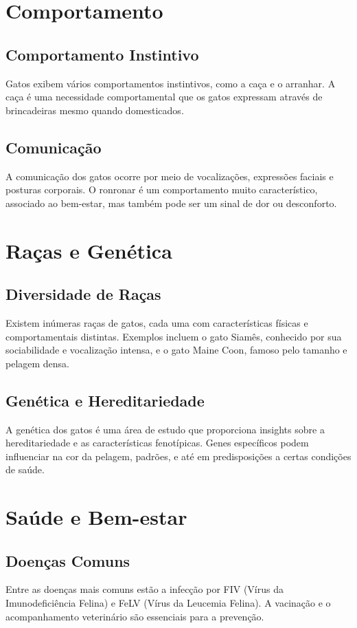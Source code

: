 \documentclass[a4paper,12pt]{report}
\begin{document}
\chapter{Comportamento}
\section{Comportamento Instintivo}
Gatos exibem vários comportamentos instintivos, como a caça e o arranhar. A caça é uma necessidade comportamental que os gatos expressam através de brincadeiras mesmo quando domesticados.

\section{Comunicação}
A comunicação dos gatos ocorre por meio de vocalizações, expressões faciais e posturas corporais. O ronronar é um comportamento muito característico, associado ao bem-estar, mas também pode ser um sinal de dor ou desconforto.

\chapter{Raças e Genética}
\section{Diversidade de Raças}
Existem inúmeras raças de gatos, cada uma com características físicas e comportamentais distintas. Exemplos incluem o gato Siamês, conhecido por sua sociabilidade e vocalização intensa, e o gato Maine Coon, famoso pelo tamanho e pelagem densa.

\section{Genética e Hereditariedade}
A genética dos gatos é uma área de estudo que proporciona insights sobre a hereditariedade e as características fenotípicas. Genes específicos podem influenciar na cor da pelagem, padrões, e até em predisposições a certas condições de saúde.

\chapter{Saúde e Bem-estar}
\section{Doenças Comuns}
Entre as doenças mais comuns estão a infecção por FIV (Vírus da Imunodeficiência Felina) e FeLV (Vírus da Leucemia Felina). A vacinação e o acompanhamento veterinário são essenciais para a prevenção.
\end{document}
